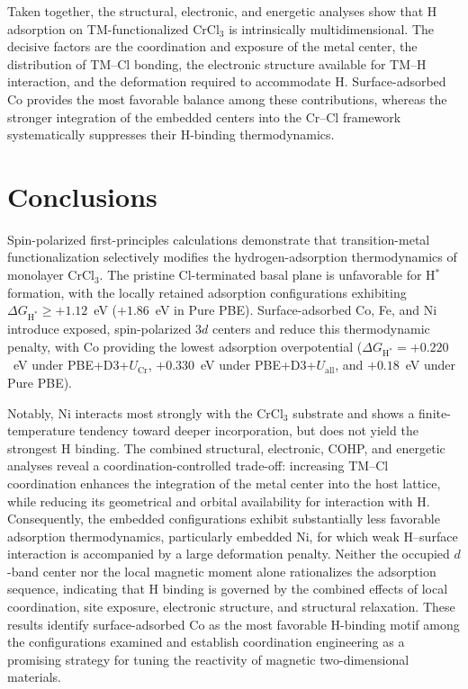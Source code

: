 \documentclass[journal=jacsat,manuscript=article]{achemso}
\begin{document}
Taken together, the structural, electronic, and energetic analyses show that H adsorption on TM-functionalized CrCl$_3$ is intrinsically multidimensional. The decisive factors are the coordination and exposure of the metal center, the distribution of TM--Cl bonding, the electronic structure available for TM--H interaction, and the deformation required to accommodate H. Surface-adsorbed Co provides the most favorable balance among these contributions, whereas the stronger integration of the embedded centers into the Cr--Cl framework systematically suppresses their H-binding thermodynamics.

\section{Conclusions}

{\color{revcolor}%
  Spin-polarized first-principles calculations demonstrate that transition-metal functionalization selectively modifies the hydrogen-adsorption thermodynamics of monolayer CrCl$_3$. The pristine Cl-terminated basal plane is unfavorable for H$^*$ formation, with the locally retained adsorption configurations exhibiting $\Delta G_{\mathrm{H}^*} \ge +1.12$~eV ($+1.86$~eV in Pure PBE). Surface-adsorbed Co, Fe, and Ni introduce exposed, spin-polarized $3d$ centers and reduce this thermodynamic penalty, with Co providing the lowest adsorption overpotential ($\Delta G_{\mathrm{H}^*}=+0.220$~eV under PBE+D3+$U_{\mathrm{Cr}}$, $+0.330$~eV under PBE+D3+$U_{\mathrm{all}}$, and $+0.18$~eV under Pure PBE).

  Notably, Ni interacts most strongly with the CrCl$_3$ substrate and shows a finite-temperature tendency toward deeper incorporation, but does not yield the strongest H binding. The combined structural, electronic, COHP, and energetic analyses reveal a coordination-controlled trade-off: increasing TM--Cl coordination enhances the integration of the metal center into the host lattice, while reducing its geometrical and orbital availability for interaction with H. Consequently, the embedded configurations exhibit substantially less favorable adsorption thermodynamics, particularly embedded Ni, for which weak H--surface interaction is accompanied by a large deformation penalty. Neither the occupied $d$-band center nor the local magnetic moment alone rationalizes the adsorption sequence, indicating that H binding is governed by the combined effects of local coordination, site exposure, electronic structure, and structural relaxation. These results identify surface-adsorbed Co as the most favorable H-binding motif among the configurations examined and establish coordination engineering as a promising strategy for tuning the reactivity of magnetic two-dimensional materials.
\par}
\end{document}
